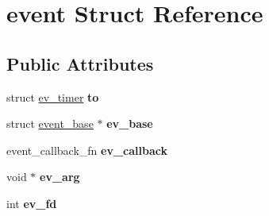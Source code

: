 \hypertarget{structevent}{\section{event Struct Reference}
\label{structevent}
}
\subsection*{Public Attributes}
\begin{DoxyCompactItemize}
\item 
\hypertarget{structevent_a657c0f8b5f5522ea6063d536f2720c0c}{\begin{tabbing}
xx\=xx\=xx\=xx\=xx\=xx\=xx\=xx\=xx\=\kill
union \{\\
\hypertarget{unionevent_1_1@12_a4482664f6cd2b8cd850bc64a4ed0521b}{\>struct \hyperlink{structev__io}{ev\_io} {\bfseries io}\\
\hypertarget{unionevent_1_1@12_a3bb994cc01a0b5cf5fad45a0c5c90e08}{\>struct \hyperlink{structev__signal}{ev\_signal} {\bfseries sig}\\
\} {\bfseries iosig}}\label{structevent_a657c0f8b5f5522ea6063d536f2720c0c}
\\

\end{tabbing}\item 
\hypertarget{structevent_a2bc71ca847b882aa99871e53e98769bd}{struct \hyperlink{structev__timer}{ev\-\_\-timer} {\bfseries to}}\label{structevent_a2bc71ca847b882aa99871e53e98769bd}

\item 
\hypertarget{structevent_ad0ca55c90047d869af935d02b6bf98d3}{struct \hyperlink{structevent__base}{event\-\_\-base} $\ast$ {\bfseries ev\-\_\-base}}\label{structevent_ad0ca55c90047d869af935d02b6bf98d3}

\item 
\hypertarget{structevent_a46ff4af8c64f00fdac8aa8c5e6368438}{event\-\_\-callback\-\_\-fn {\bfseries ev\-\_\-callback}}\label{structevent_a46ff4af8c64f00fdac8aa8c5e6368438}

\item 
\hypertarget{structevent_a73daed0b06adc2661c2bb5cac36b6d72}{void $\ast$ {\bfseries ev\-\_\-arg}}\label{structevent_a73daed0b06adc2661c2bb5cac36b6d72}

\item 
\hypertarget{structevent_ac4e9ba9d79228d625bd80d441df1b6ef}{int {\bfseries ev\-\_\-fd}}\label{structevent_ac4e9ba9d79228d625bd80d441df1b6ef}

}
\end{DoxyCompactItemize}
